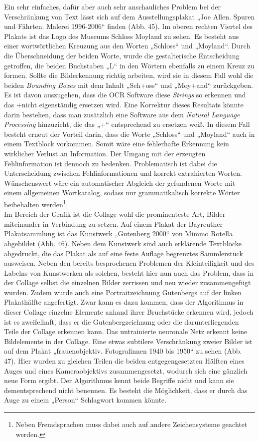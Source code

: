 \documentclass[a4paper,12pt,ngerman]{article}
\begin{document}
Ein sehr einfaches, dafür aber auch sehr anschauliches Problem bei der Verschränkung von Text lässt sich auf dem Ausstellungsplakat „Joe Allen. Spuren und Fährten. Malerei 1996-2006“ finden (Abb. 45). Im oberen rechten Viertel des Plakats ist das Logo des Museums Schloss Moyland zu sehen. Es besteht aus einer wortwörtlichen Kreuzung aus den Worten „Schloss“ und „Moyland“. Durch die Überschneidung der beiden Worte, wurde die gestalterische Entscheidung getroffen, die beiden Buchstaben „L“ in den Wörtern ebenfalls zu einem Kreuz zu formen. Sollte die Bilderkennung richtig arbeiten, wird sie in diesem Fall wohl die beiden \textit{Bounding Boxes} mit dem Inhalt „Sch+oss“ und „Moy+and“ zurückgeben. Es ist davon auszugehen, dass die OCR Software diese \textit{Strings} so erkennen und das \glqq +\grqq nicht eigenständig ersetzen wird. Eine Korrektur dieses Resultats könnte darin bestehen, dass man zusätzlich eine Software aus dem \textit{Natural Language Processing} hinzuzieht, die das „+“ entsprechend zu ersetzen weiß. In diesem Fall besteht erneut der Vorteil darin, dass die Worte „Schloss“ und „Moyland“ auch in einem Textblock vorkommen. Somit wäre eine fehlerhafte Erkennung kein wirklicher Verlust an Information. Der Umgang mit der erzeugten Fehlinformation ist dennoch zu bedenken. Problematisch ist dabei die Unterscheidung zwischen Fehlinformationen und korrekt extrahierten Worten. Wünschenswert wäre ein automatischer Abgleich der gefundenen Worte mit einem allgemeinen Wortkatalog, sodass nur grammatikalisch korrekte Wörter beibehalten werden\footnote{Neben Fremdsprachen muss dabei auch auf andere Zeichensysteme geachtet werden.}. \\
Im Bereich der Grafik ist die Collage wohl die prominenteste Art, Bilder miteinander in Verbindung zu setzen. Auf einem Plakat der Bayreuther Plakatsammlung ist das Kunstwerk „Gutenberg 2000“ von Mimmo Rotella abgebildet (Abb. 46). Neben dem Kunstwerk sind auch erklärende Textblöcke abgedruckt, die das Plakat als auf eine feste Auflage begrenztes Sammlerstück ausweisen. Neben den bereits besprochenen Problemen der Kleinteiligkeit und des Labelns von Kunstwerken als solchen, besteht hier nun auch das Problem, dass in der Collage selbst die einzelnen Bilder zerrissen und neu wieder zusammengefügt wurden. Zudem wurde auch eine Portraitzeichnung Gutenbergs auf der linken Plakathälfte angefertigt. Zwar kann es dazu kommen, dass der Algorithmus in dieser Collage einzelne Elemente anhand ihrer Bruchstücke erkennen wird, jedoch ist es zweifelhaft, dass er die Gutenbergzeichnung oder die darunterliegenden Teile der Collage erkennen kann. Das untrainierte neuronale Netz erkennt keine Bildelemente in der Collage. Eine etwas subtilere Verschränkung zweier Bilder ist auf dem Plakat „frauenobjektiv. Fotografinnen 1940 bis 1950“ zu sehen (Abb. 47). Hier wurden zu gleichen Teilen die beiden entgegengesetzten Hälften eines Auges und eines Kameraobjektivs zusammengesetzt, wodurch sich eine gänzlich neue Form ergibt. Der Algorithmus kennt beide Begriffe nicht und kann sie dementsprechend nicht benennen. Es besteht die Möglichkeit, dass er durch das Auge zu einem „Person“ Schlagwort kommen könnte. \\
\end{document}
